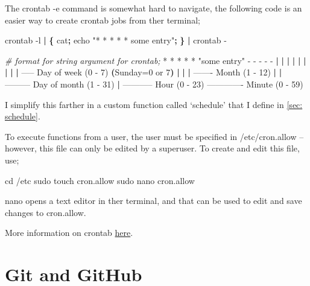 \documentclass[]{article}
\newenvironment{Shaded}{\begin{snugshade}}{\end{snugshade}}
\newcommand{\KeywordTok}[1]{\textcolor[rgb]{0.13,0.29,0.53}{\textbf{#1}}}
\newcommand{\StringTok}[1]{\textcolor[rgb]{0.31,0.60,0.02}{#1}}
\newcommand{\CommentTok}[1]{\textcolor[rgb]{0.56,0.35,0.01}{\textit{#1}}}
\newcommand{\FunctionTok}[1]{\textcolor[rgb]{0.00,0.00,0.00}{#1}}
\newcommand{\VariableTok}[1]{\textcolor[rgb]{0.00,0.00,0.00}{#1}}
\newcommand{\BuiltInTok}[1]{#1}
\newcommand{\ExtensionTok}[1]{#1}
\newcommand{\NormalTok}[1]{#1}
\begin{document}
The crontab -e command is somewhat hard to navigate, the following code
is an easier way to create crontab jobs from ther terminal;

\begin{Shaded}
\begin{Highlighting}[]
\ExtensionTok{crontab}\NormalTok{ -l }\KeywordTok{|} \KeywordTok{\{} \FunctionTok{cat}\KeywordTok{;} \BuiltInTok{echo} \StringTok{"* * * * * some entry"}\KeywordTok{;} \KeywordTok{\}} \KeywordTok{|} \ExtensionTok{crontab}\NormalTok{ -}

\CommentTok{# format for string argument for crontab;}
\ExtensionTok{*}\NormalTok{ * * * * }\StringTok{"some entry"}
\ExtensionTok{-}\NormalTok{ - - - -}
\KeywordTok{|} \KeywordTok{|} \KeywordTok{|} \KeywordTok{|} \KeywordTok{|}
\KeywordTok{|} \KeywordTok{|} \KeywordTok{|} \KeywordTok{|} \ExtensionTok{-----}\NormalTok{ Day of week (0 - 7) }\KeywordTok{(}\VariableTok{Sunday=}\NormalTok{0 }\ExtensionTok{or}\NormalTok{ 7}\KeywordTok{)}
\KeywordTok{|} \KeywordTok{|} \KeywordTok{|} \ExtensionTok{-------}\NormalTok{ Month (1 - 12)}
\KeywordTok{|} \KeywordTok{|} \ExtensionTok{---------}\NormalTok{ Day of month (1 - 31)}
\KeywordTok{|} \ExtensionTok{-----------}\NormalTok{ Hour (0 - 23)}
\ExtensionTok{-------------}\NormalTok{ Minute (0 - 59)}
\end{Highlighting}
\end{Shaded}

I simplify this farther in a custom function called `schedule' that I
define in \ref{sec: schedule}.

To execute functions from a user, the user must be specified in
/etc/cron.allow -- however, this file can only be edited by a superuser.
To create and edit this file, use;

\begin{Shaded}
\begin{Highlighting}[]
\BuiltInTok{cd}\NormalTok{ /etc}
\FunctionTok{sudo}\NormalTok{ touch cron.allow}
\FunctionTok{sudo}\NormalTok{ nano cron.allow}
\end{Highlighting}
\end{Shaded}

nano opens a text editor in ther terminal, and that can be used to edit
and save changes to cron.allow.

More information on crontab
\href{https://www.computerhope.com/unix/ucrontab.htm}{\color{blue} here}.

\section{Git and GitHub}
\end{document}
